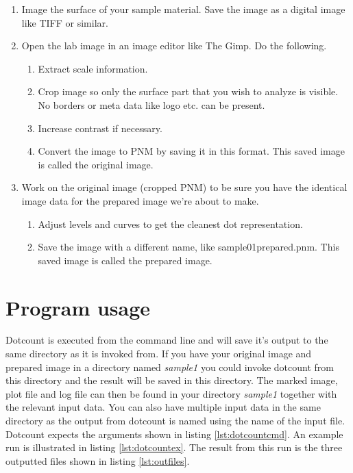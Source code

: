 \documentclass[a4paper,10pt]{book}
\begin{document}
\begin{enumerate}
  \label{lst:preproutine}
  \item Image the surface of your sample material. Save the image as a digital
image like TIFF or similar.
  \item Open the lab image in an image editor like The Gimp. Do the following.
  \begin{enumerate}
    \item Extract scale information.
    \item Crop image so only the surface part that you wish to analyze is
visible. No borders or meta data like logo etc. can be present.
    \item Increase contrast if necessary.
    \item Convert the image to PNM by saving it in this format. This saved
image is called the original image.
  \end{enumerate}
  \item Work on the original image (cropped PNM) to be sure you have the
identical image data for the prepared image we're about to make.
  \begin{enumerate}
    \item Adjust levels and curves to get the cleanest dot representation. 
    \item Save the image with a different name, like sample01prepared.pnm. This
saved image is called the prepared image.
  \end{enumerate}
\end{enumerate}

\chapter{Program usage}
\label{chap:usage}
Dotcount is executed from the command line and will save it's output to the
same directory as it is invoked from. If you have your original image and
prepared image in a directory named \textit{sample1} you could invoke dotcount
from this directory and the result will be saved in this directory. The
marked image, plot file and log file can then be found in your directory
\textit{sample1} together with the relevant input data. You can also have
multiple input data in the same directory as the output from dotcount is named
using the name of the input file. Dotcount expects the arguments shown in
listing \ref{lst:dotcountcmd}. An example run is illustrated in listing
\ref{lst:dotcountex}. The result from this run is the three outputted files
shown in listing \ref{lst:outfiles}.
\end{document}
